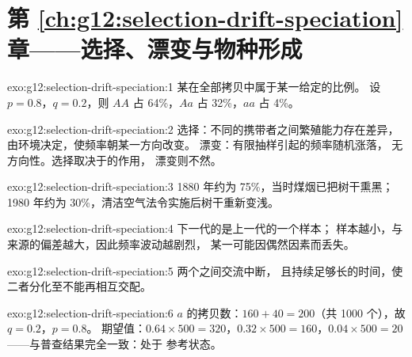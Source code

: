 \section*{第 \ref{ch:g12:selection-drift-speciation} 章——选择、漂变与物种形成}

\begin{solution}{exo:g12:selection-drift-speciation:1}
某在全部拷贝中属于某一给定的比例。
设 $p = 0.8$，$q = 0.2$，则 $AA$ 占 64\%，$Aa$ 占 32\%，$aa$ 占 4\%。
\end{solution}

\begin{solution}{exo:g12:selection-drift-speciation:2}
选择：不同的携带者之间繁殖能力存在差异，
由环境决定，使频率朝某一方向改变。
漂变：有限抽样引起的频率随机涨落，
无方向性。选择取决于的作用，
漂变则不然。
\end{solution}

\begin{solution}{exo:g12:selection-drift-speciation:3}
1880 年约为 75\%，当时煤烟已把树干熏黑；
1980 年约为 30\%，清洁空气法令实施后树干重新变浅。
\end{solution}

\begin{solution}{exo:g12:selection-drift-speciation:4}
下一代的是上一代的一个样本；
样本越小，与来源的偏差越大，因此频率波动越剧烈，
某一可能因偶然因素而丢失。
\end{solution}

\begin{solution}{exo:g12:selection-drift-speciation:5}
两个之间交流中断，
且持续足够长的时间，使二者分化至不能再相互交配。
\end{solution}

\begin{solution}{exo:g12:selection-drift-speciation:6}
$a$ 的拷贝数：$160 + 40 = 200$（共 1000 个），故 $q = 0.2$，$p = 0.8$。
期望值：$0.64 \times 500 = 320$，$0.32 \times 500 = 160$，$0.04
\times 500 = 20$——与普查结果完全一致：处于
参考状态。
\end{solution}

